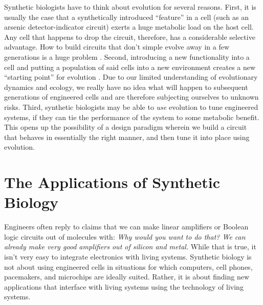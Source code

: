 Synthetic biologists have to think about evolution for several
reasons. First, it is usually the case that a synthetically introduced
``feature'' in a cell (such as an arsenic detector-indicator circuit)
exerts a huge metabolic load on the host cell. Any cell that happens
to drop the circuit, therefore, has a considerable selective
advantage. How to build circuits that don't simple evolve away in a
few generations is a huge problem
\cite{carlton-endy}. Second,
introducing a new functionality into a cell and putting a population
of said cells into a new environment creates a new ``starting point''
for evolution \cite{fast-cheap}. Due to our limited
understanding of evolutionary dynamics and ecology, we really have no
idea what will happen to subsequent generations of engineered cells
and are therefore subjecting ourselves to unknown risks. Third,
synthetic biologists may be able to {\em use} evolution to tune
engineered systems, if they can tie the performance of the system to
some metabolic benefit. This opens up the possibility of a design
paradigm wherein we build a circuit that behaves in essentially the
right manner, and then tune it into place using evolution.


\section{The Applications of Synthetic Biology}

Engineers often reply to claims that we can make linear amplifiers or
Boolean logic circuits out of molecules with: {\em Why would you want
  to do that? We can already make very good amplifiers out of silicon
  and metal.} While that is true, it isn't very easy to integrate
electronics with living systems. Synthetic biology is not about using
engineered cells in situations for which computers, cell phones,
pacemakers, and microchips are ideally suited. Rather, it is about
finding new applications that interface with living systems using the
technology of living systems. 

